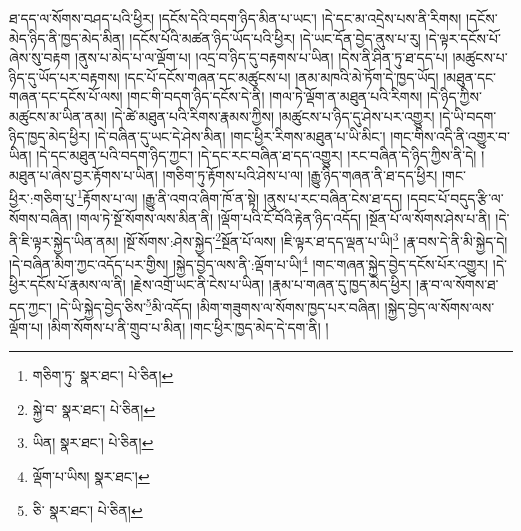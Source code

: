 ཐ་དད་ལ་སོགས་བཤད་པའི་ཕྱིར། །དངོས་དེའི་བདག་ཉིད་མིན་པ་ཡང་། །དེ་དང་མ་འདྲེས་པས་ནི་རིགས། །དངོས་མེད་ཉིད་ནི་ཁྱད་མེད་མིན། །དངོས་པོའི་མཚན་ཉིད་ཡོད་པའི་ཕྱིར། །དེ་ཡང་དོན་བྱེད་ནུས་པ་རུ། །དེ་ལྟར་དངོས་པོ་ཞེས་སུ་བརྟག །ནུས་པ་མེད་པ་ལ་ལྡོག་པ། །འདྲ་བ་ཉིད་དུ་བརྟགས་པ་ཡིན། །དེས་ནི་ཤིན་ཏུ་ཐ་དད་པ། །མཚུངས་པ་ཉིད་དུ་ཡོད་པར་བརྟགས། །དང་པོ་དངོས་གཞན་དང་མཚུངས་པ། །ནམ་མཁའི་མེ་ཏོག་དེ་ཁྱད་ཡོད། །མཐུན་དང་གཞན་དང་དངོས་པོ་ལས། །གང་གི་བདག་ཉིད་དངོས་དེ་ནི། །གལ་ཏེ་ལྡོག་ན་མཐུན་པའི་རིགས། །དེ་ཉིད་ཀྱིས་མཚུངས་མ་ཡིན་ནམ། །དེ་ཚེ་མཐུན་པའི་རིགས་རྣམས་ཀྱིས། །མཚུངས་པ་ཉིད་དུ་ཤེས་པར་འགྱུར། །དེ་ཡི་བདག་ཉིད་ཁྱད་མེད་ཕྱིར། །དེ་བཞིན་དུ་ཡང་དེ་ཤེས་མིན། །གང་ཕྱིར་རིགས་མཐུན་པ་ཡི་མིང་། །གང་གིས་འདི་ནི་འགྱུར་བ་ཡིན། །དེ་དང་མཐུན་པའི་བདག་ཉིད་ཀྱང་། །དེ་དང་རང་བཞིན་ཐ་དད་འགྱུར། །རང་བཞིན་དེ་ཉིད་ཀྱིས་ནི་དེ། །མཐུན་པ་ཞེས་བྱར་རྟོགས་པ་ཡིན། །གཅིག་ཏུ་རྟོགས་པའི་ཤེས་པ་ལ། །རྒྱུ་ཉིད་གཞན་ནི་ཐ་དད་ཕྱིར། །གང་ཕྱིར་:གཅིག་པུ་\footnote{གཅིག་ཏུ་  སྣར་ཐང་།  པེ་ཅིན། }རྟོགས་པ་ལ། །རྒྱུ་ནི་འགའ་ཞིག་ཁོ་ན་སྟེ། །ནུས་པ་རང་བཞིན་ངེས་ཐ་དད། །དབང་པོ་བདུད་རྩི་ལ་སོགས་བཞིན། །གལ་ཏེ་སྔོ་སོགས་ལས་མིན་ནི། །ལྡོག་པའི་ངོ་བོའི་རྟེན་ཉིད་འདོད། །སྔོན་པོ་ལ་སོགས་ཤེས་པ་ནི། །དེ་ནི་ཇི་ལྟར་སྐྱེད་ཡིན་ནམ། །སྔོ་སོགས་:ཤེས་སྐྱེད་\footnote{སྐྱེ་བ་  སྣར་ཐང་།  པེ་ཅིན། }སྔོན་པོ་ལས། །ཇི་ལྟར་ཐ་དད་ལྡན་པ་ཡི།\footnote{ཡིན།  སྣར་ཐང་།  པེ་ཅིན། } །རྣ་བས་དེ་ནི་མི་སྐྱེད་དེ། །དེ་བཞིན་མིག་ཀྱང་འདོད་པར་གྱིས། །སྐྱེད་བྱེད་ལས་ནི་:ལྡོག་པ་ཡི།\footnote{ལྡོག་པ་ཡིས།  སྣར་ཐང་། } །གང་གཞན་སྐྱེད་བྱེད་དངོས་པོར་འགྱུར། །དེ་ཕྱིར་དངོས་པོ་རྣམས་ལ་ནི། །རྗེས་འགྲོ་ཡང་ནི་ངེས་པ་ཡིན། །རྣམ་པ་གཞན་དུ་ཁྱད་མེད་ཕྱིར། །རྣ་བ་ལ་སོགས་ཐ་དད་ཀྱང་། །དེ་ཡི་སྐྱེད་བྱེད་ཅིས་\footnote{ཅི་  སྣར་ཐང་།  པེ་ཅིན། }མི་འདོད། །མིག་གཟུགས་ལ་སོགས་ཁྱད་པར་བཞིན། །སྐྱེད་བྱེད་ལ་སོགས་ལས་ལྡོག་པ། །མིག་སོགས་པ་ནི་གྲུབ་པ་མིན། །གང་ཕྱིར་ཁྱད་མེད་དེ་དག་ནི། །

